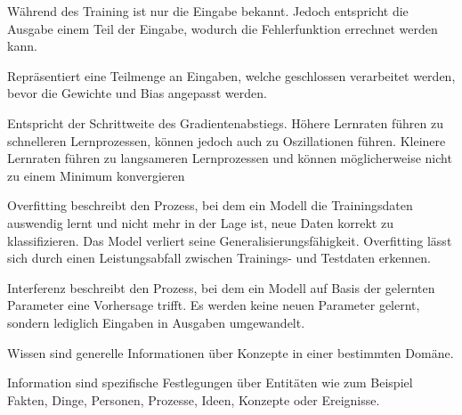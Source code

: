 \begin{definition}\label{def:selbstüberwachtes-lernen}
    Während des Training ist nur die Eingabe bekannt.
    Jedoch entspricht die Ausgabe einem Teil der Eingabe, wodurch die Fehlerfunktion errechnet werden kann.
\end{definition}

\begin{definition}[Batch]\label{def:batch}
    Repräsentiert eine Teilmenge an Eingaben, welche geschlossen verarbeitet werden, bevor die Gewichte und Bias angepasst werden.
\end{definition}

\begin{definition}[Lernrate]\label{def:lernrate}
    Entspricht der Schrittweite des Gradientenabstiegs. Höhere Lernraten führen zu schnelleren Lernprozessen, können jedoch auch zu Oszillationen führen.
    Kleinere Lernraten führen zu langsameren Lernprozessen und können möglicherweise nicht zu einem Minimum konvergieren
\end{definition}

\begin{definition}[Overfitting]\label{def:overfitting}
    Overfitting beschreibt den Prozess, bei dem ein Modell die Trainingsdaten auswendig lernt und nicht mehr in der Lage ist,
    neue Daten korrekt zu klassifizieren. Das Model verliert seine Generalisierungsfähigkeit. Overfitting lässt sich durch einen Leistungsabfall zwischen 
    Trainings- und Testdaten erkennen.
\end{definition}

\begin{definition}[Interferenz]\label{def:interferenz}
    Interferenz beschreibt den Prozess, bei dem ein Modell auf Basis der gelernten Parameter eine Vorhersage trifft.
    Es werden keine neuen Parameter gelernt, sondern lediglich Eingaben in Ausgaben umgewandelt.
\end{definition}


\begin{definition}[Wissen]\label{def:wissen}
    Wissen sind generelle Informationen über Konzepte in einer bestimmten Domäne.
\end{definition}

\begin{definition}[Information]\label{def:information}
    Information sind spezifische Festlegungen über Entitäten wie zum Beispiel Fakten, Dinge, Personen, Prozesse, Ideen, Konzepte oder Ereignisse.
\end{definition}

